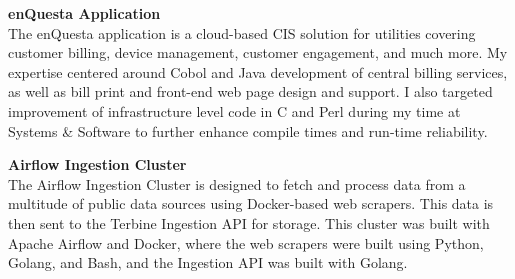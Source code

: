 \documentclass{res}
\begin{document}
\begin{resume}
\vspace{-5pt}

        {\bf enQuesta Application} \hfill \vspace{5pt} \\
           The enQuesta application is a cloud-based CIS solution for utilities covering customer billing, device management, customer engagement, and much more. My expertise centered around Cobol and Java development of central billing services, as well as bill print and front-end web page design and support. I also targeted improvement of infrastructure level code in C and Perl during my time at Systems \& Software to further enhance compile times and run-time reliability.

\begin{comment}
\vspace{-5pt}
    
		{\bf Ingestion API} \hfill \vspace{5pt} \\
			The Terbine Ingestion API is designed to function as the middle man between independent programs orchestrated by Apache Airflow that collect data, and multiple PostgreSQL database connections. This API was built with Golang.
\end{comment}

\vspace{-5pt}

		{\bf Airflow Ingestion Cluster} \hfill \vspace{5pt} \\
			The Airflow Ingestion Cluster is designed to fetch and process data from a multitude of public data sources using Docker-based web scrapers. This data is then sent to the Terbine Ingestion API for storage. This cluster was built with Apache Airflow and Docker, where the web scrapers were built using Python, Golang, and Bash, and the Ingestion API was built with Golang.
\vspace{-5pt}

\begin{comment}
		{\bf Ingestion Index Crawler} \hfill \vspace{5pt}\\
			This crawler is designed to reduce search times of already ingested Terbine searcher data. It crawls all instances for a specified user, and produces a list that can be easily and quickly searched. This software was built using Docker and Selenium in Python.
\vspace{-5pt}
\end{comment}


\end{resume}
\end{document}
